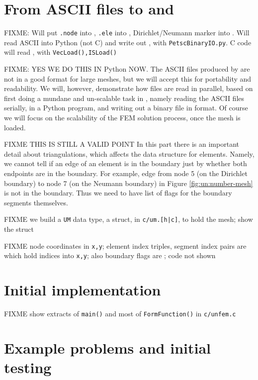 \section{From ASCII files to \PETSc \pIS and \pVec}

FIXME: Will put \texttt{.node} into \pVec, \texttt{.ele} into \pIS, Dirichlet/Neumann marker into \pIS.  Will read ASCII into Python (not C) and write out \pVec, \pIS with \texttt{PetscBinaryIO.py}.  C code will read \pVec, \pIS with \texttt{VecLoad(),ISLoad()}

FIXME: YES WE DO THIS IN Python NOW.  The ASCII files produced by \Triangle are not in a good format for large meshes, but we will accept this for portability and readability.  We will, however, demonstrate how files are read in parallel, based on first doing a mundane and un-scalable task in \PETSc, namely reading the ASCII \Triangle files serially, in a Python program, and writing out a binary file in \PETSc format.  Of course we will focus on the scalability of the FEM solution process, once the mesh is loaded.

FIXME THIS IS STILL A VALID POINT  In this part there is an important detail about triangulations, which affects the data structure for elements.  Namely, we cannot tell if an edge of an element is in the boundary just by whether both endpoints are in the boundary.  For example, edge from node 5 (on the Dirichlet boundary) to node 7 (on the Neumann boundary) in Figure \ref{fig:un:number-mesh} is not in the boundary.  Thus we need to have list of flags for the boundary segments themselves.

FIXME we build a \texttt{UM} data type, a struct, in \texttt{c/\CODELOC um.[h|c]}, to hold the mesh; show the struct

FIXME node coordinates in \pVecs \texttt{x,y}; element index triples, segment index pairs are \pIS which hold indices into \texttt{x,y}; also boundary flags are \pIS; code not shown

\section{Initial implementation}

FIXME show extracts of \texttt{main()} and most of \texttt{FormFunction()} in \texttt{c/\CODELOC unfem.c}

\section{Example problems and initial testing}

